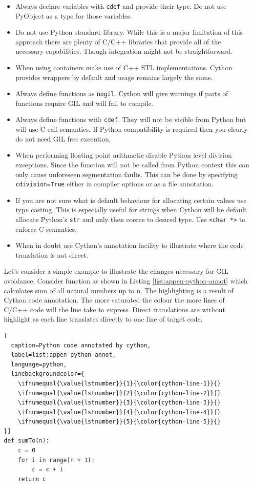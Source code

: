 \documentclass[12pt, a4paper]{report}
\begin{document}
\begin{appendices}
\begin{itemize}
  \item Always declare variables with \lstinline{cdef} and provide their type.
    Do not use PyObject as a type for those variables.
  \item Do not use Python standard library. While this is a major limitation
  of this approach there are plenty of C/C++ libraries that provide all of
  the necessary capabilities. Though integration might not be straightforward.
  \item When using containers make use of C++ STL implementations.
    Cython provides wrappers by default and usage remains largely the same.
  \item Always define functions as \lstinline{nogil}. Cython will give warnings
    if parts of functions require GIL and will fail to compile.
  \item Always define functions with \lstinline{cdef}. They will not be visible
    from Python but will use C call semantics. If Python compatibility is required
    then you clearly do not need GIL free execution.
  \item When performing floating point arithmetic disable Python level division
    exceptions. Since the function will not be called from Python context this
    can only cause unforeseen segmentation faults. This can be done by specifying
    \lstinline{cdivision=True} either in compiler options or as a file annotation.
  \item If you are not sure what is default behaviour for allocating certain values
    use type casting. This is especially useful for strings when Cython will
    be default allocate Python's \lstinline{str} and only then coerce to desired
    type. Use \lstinline{<char *>} to enforce C semantics.
  \item When in doubt use Cython's annotation facility to illustrate where the
    code translation is not direct.
\end{itemize}

Let's consider a simple example to illustrate the changes necessary for GIL avoidance.
Consider function as shown in Listing \ref{list:appen-python-annot} which calculates
sum of all natural numbers up to n. The highlighting is a result of Cython code
annotation. The more saturated the colour the more lines of C/C++ code will the
line take to express. Direct translations are without highlight as each line translates
directly to one line of target code.

\begin{lstlisting}[
  caption=Python code annotated by cython,
  label=list:appen-python-annot,
  language=python,
  linebackgroundcolor={
    \ifnumequal{\value{lstnumber}}{1}{\color{cython-line-1}}{}
    \ifnumequal{\value{lstnumber}}{2}{\color{cython-line-2}}{}
    \ifnumequal{\value{lstnumber}}{3}{\color{cython-line-3}}{}
    \ifnumequal{\value{lstnumber}}{4}{\color{cython-line-4}}{}
    \ifnumequal{\value{lstnumber}}{5}{\color{cython-line-5}}{}
}]
def sumTo(n):
    c = 0
    for i in range(n + 1):
        c = c + i
    return c
\end{lstlisting}


\end{appendices}
\end{document}

